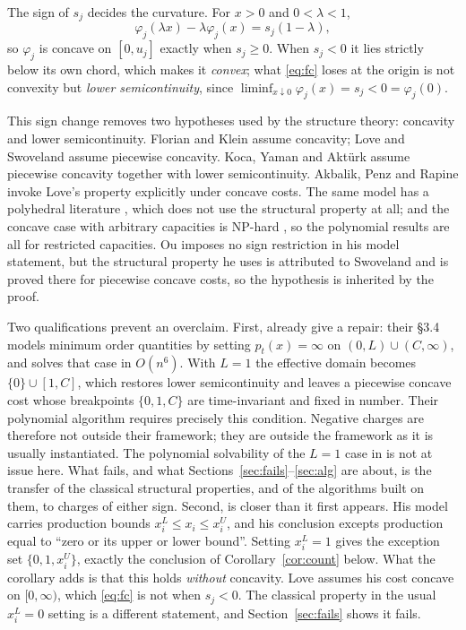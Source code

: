 \documentclass[review,11pt]{elsarticle}
\theoremstyle{remark}
\theoremstyle{definition}
\begin{document}
The sign of $s_j$ decides the curvature. For $x>0$ and $0<\lambda<1$,
\begin{equation}\label{eq:chord}
\varphi_j(\lambda x)-\lambda\varphi_j(x)=s_j(1-\lambda),
\end{equation}
so $\varphi_j$ is concave on $[0,u_j]$ exactly when $s_j\ge0$. When $s_j<0$ it lies
strictly below its own chord, which makes it \emph{convex}; what \eqref{eq:fc} loses at
the origin is not convexity but \emph{lower semicontinuity}, since
$\liminf_{x\downarrow0}\varphi_j(x)=s_j<0=\varphi_j(0)$.

This sign change removes two hypotheses used by the structure theory: concavity and lower
semicontinuity. Florian and Klein \cite{fk71} assume concavity;
Love \cite{love73} and Swoveland \cite{swoveland75} assume piecewise concavity. Koca,
Yaman and Akt\"urk \cite{kya14} assume piecewise concavity together with lower
semicontinuity. Akbalik, Penz and Rapine \cite{apr15} invoke Love's property explicitly
under concave costs. The same model has a polyhedral literature \cite{ak05}, which does
not use the structural property at all; and the concave case with arbitrary capacities is
NP-hard \cite{flr80}, so the polynomial results are all for restricted capacities. Ou \cite{ou17} imposes no sign restriction in his model statement,
but the structural property he uses is attributed to Swoveland and is proved there for
piecewise concave costs, so the hypothesis is inherited by the proof.

Two qualifications prevent an overclaim. First, \cite{kya14} already give a repair:
their \S3.4 models minimum order quantities by setting $p_t(x)=\infty$ on
$(0,L)\cup(C,\infty)$, and solves that case in $O(n^6)$. With $L=1$ the effective domain
becomes $\{0\}\cup[1,C]$, which restores lower semicontinuity and leaves a piecewise
concave cost whose breakpoints $\{0,1,C\}$ are time-invariant and fixed in number. Their
polynomial algorithm requires precisely this condition. Negative charges are
therefore not outside their framework; they are outside the framework as it is usually
instantiated. The polynomial solvability of the $L=1$ case in \cite{kya14} is not at issue
here. What fails, and what Sections~\ref{sec:fails}--\ref{sec:alg} are about, is the
transfer of the classical structural properties, and of the algorithms built on them, to
charges of either sign.
Second, \cite{love73} is closer than it first appears. His model carries production bounds
$x^L_i\le x_i\le x^U_i$, and his conclusion excepts production equal to ``zero or its
upper or lower bound''. Setting $x^L_i=1$ gives the exception set $\{0,1,x^U_i\}$, exactly
the conclusion of Corollary~\ref{cor:count} below. What the corollary adds
is that this holds \emph{without} concavity. Love assumes his cost concave on
$[0,\infty)$, which \eqref{eq:fc} is not when $s_j<0$. The classical property in the usual
$x^L_i=0$ setting is a different statement, and Section~\ref{sec:fails} shows it fails.
\end{document}

